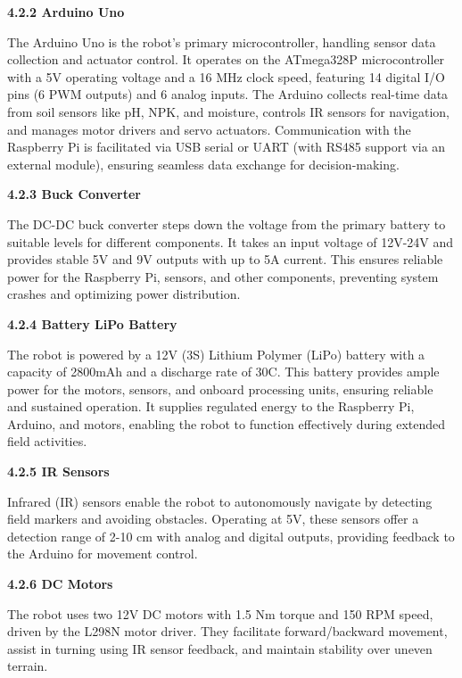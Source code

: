\documentclass{book} %
\begin{document}
\noindent \textbf{4.2.2 Arduino Uno}

\noindent  The Arduino Uno is the robot's primary microcontroller, handling sensor data collection and actuator control. It operates on the ATmega328P microcontroller with a 5V operating voltage and a 16 MHz clock speed, featuring 14 digital I/O pins (6 PWM outputs) and 6 analog inputs. The Arduino collects real-time data from soil sensors like pH, NPK, and moisture, controls IR sensors for navigation, and manages motor drivers and servo actuators. Communication with the Raspberry Pi is facilitated via USB serial or UART (with RS485 support via an external module), ensuring seamless data exchange for decision-making.

\noindent \textbf{4.2.3 Buck Converter}

\noindent The DC-DC buck converter steps down the voltage from the primary battery to suitable levels for different components. It takes an input voltage of 12V-24V and provides stable 5V and 9V outputs with up to 5A current. This ensures reliable power for the Raspberry Pi, sensors, and other components, preventing system crashes and optimizing power distribution.

\noindent \textbf{}

\noindent \textbf{}

\noindent \textbf{4.2.4 Battery LiPo Battery}

\noindent The robot is powered by a 12V (3S) Lithium Polymer (LiPo) battery with a capacity of 2800mAh and a discharge rate of 30C. This battery provides ample power for the motors, sensors, and onboard processing units, ensuring reliable and sustained operation. It supplies regulated energy to the Raspberry Pi, Arduino, and motors, enabling the robot to function effectively during extended field activities.\textbf{}

\noindent \textbf{4.2.5 IR Sensors}

\noindent Infrared (IR) sensors enable the robot to autonomously navigate by detecting field markers and avoiding obstacles. Operating at 5V, these sensors offer a detection range of 2-10 cm with analog and digital outputs, providing feedback to the Arduino for movement control.

\noindent \textbf{4.2.6 DC Motors}

\noindent The robot uses two 12V DC motors with 1.5 Nm torque and 150 RPM speed, driven by the L298N motor driver. They facilitate forward/backward movement, assist in turning using IR sensor feedback, and maintain stability over uneven terrain.
\end{document}
